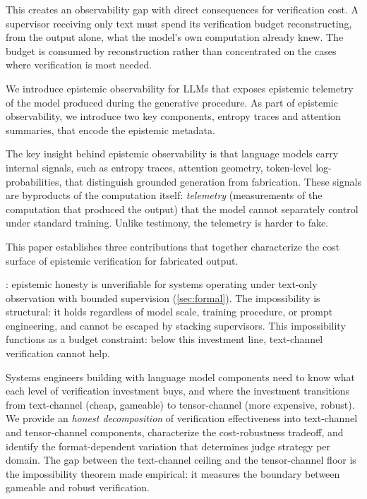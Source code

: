 This creates an observability gap with direct consequences for
verification cost. A supervisor receiving only text must spend its
verification budget reconstructing, from the output alone,
what the model's own computation already knew. The budget is
consumed by reconstruction rather than concentrated on the cases
where verification is most needed.

We introduce epistemic observability for LLMs that exposes epistemic
telemetry of the model produced during the generative procedure.
As part of epistemic observability, we introduce two key components, entropy traces
and attention summaries, that encode the epistemic metadata.

The key insight behind epistemic observability is that language models carry internal
signals, such as entropy traces, attention geometry, token-level
log-probabilities, that distinguish grounded generation from
fabrication. These signals are byproducts of the computation itself:
\emph{telemetry} (measurements of the computation that produced the output)
that the model cannot separately control under standard training.
Unlike testimony, the telemetry is harder to fake.

This paper establishes three contributions that together characterize the cost
surface of epistemic verification for fabricated output.

: epistemic honesty is unverifiable for
systems operating under text-only observation with bounded supervision
(\autoref{sec:formal}).
The impossibility is structural: it holds regardless
of model scale, training procedure, or prompt engineering, and
cannot be escaped by stacking supervisors.
This impossibility functions as a budget constraint: below this
investment line, text-channel verification cannot help.

Systems engineers building with language
model components need to know what each level of verification investment
buys, and where the investment transitions from text-channel (cheap,
gameable) to tensor-channel (more expensive, robust).
We provide an \emph{honest decomposition}
of verification effectiveness into text-channel and tensor-channel
components, characterize the cost-ro\-bust\-ness tradeoff, and identify
the format-dependent variation that determines judge strategy per domain.
The gap between the text-channel
ceiling and the tensor-channel floor is the impossibility theorem made
empirical: it measures the boundary between gameable and robust verification.

